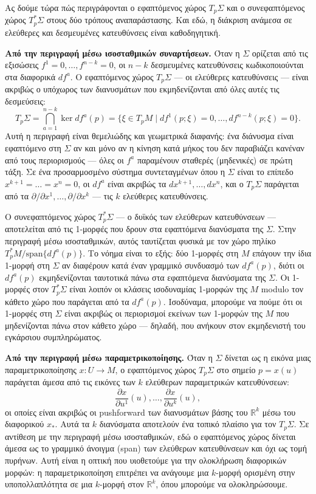 \documentclass[11pt,a4paper,twoside,openright]{book}
\begin{document}
Ας δούμε τώρα πώς περιγράφονται ο εφαπτόμενος χώρος $T_p\Sigma$ και ο συνεφαπτόμενος χώρος $T_p^*\Sigma$ στους δύο τρόπους αναπαράστασης. Και εδώ, η διάκριση ανάμεσα σε ελεύθερες και δεσμευμένες κατευθύνσεις είναι καθοδηγητική.

\textbf{Από την περιγραφή μέσω ισοσταθμικών συναρτήσεων.} Όταν η $\Sigma$ ορίζεται από τις εξισώσεις $f^1 = 0, \dots, f^{n-k} = 0$, οι $n-k$ δεσμευμένες κατευθύνσεις κωδικοποιούνται στα διαφορικά $df^a$. Ο εφαπτόμενος χώρος $T_p\Sigma$ --- οι ελεύθερες κατευθύνσεις --- είναι ακριβώς ο υπόχωρος των διανυσμάτων που εκμηδενίζονται από όλες αυτές τις δεσμεύσεις:
\[
T_p\Sigma = \bigcap_{a=1}^{n-k} \ker df^a(p) = \{ \xi \in T_pM \mid df^1(p; \xi) = 0, \dots, df^{n-k}(p; \xi) = 0 \}. \tag{0.12}
\]
Αυτή η περιγραφή είναι θεμελιώδης και γεωμετρικά διαφανής: ένα διάνυσμα είναι εφαπτόμενο στη $\Sigma$ αν και μόνο αν η κίνηση κατά μήκος του δεν παραβιάζει κανέναν από τους περιορισμούς --- όλες οι $f^a$ παραμένουν σταθερές (μηδενικές) σε πρώτη τάξη. Σε ένα προσαρμοσμένο σύστημα συντεταγμένων όπου η $\Sigma$ είναι το επίπεδο $x^{k+1} = \dots = x^n = 0$, οι $df^a$ είναι ακριβώς τα $dx^{k+1}, \dots, dx^n$, και ο $T_p\Sigma$ παράγεται από τα $\partial / \partial x^1, \dots, \partial / \partial x^k$ --- τις $k$ ελεύθερες κατευθύνσεις.

Ο συνεφαπτόμενος χώρος $T_p^*\Sigma$ --- ο δυϊκός των ελεύθερων κατευθύνσεων --- αποτελείται από τις 1-μορφές που δρουν στα εφαπτόμενα διανύσματα της $\Sigma$. Στην περιγραφή μέσω ισοσταθμικών, αυτός ταυτίζεται φυσικά με τον χώρο πηλίκο $T_p^*M / \text{span}\{df^a(p)\}$. Το νόημα είναι το εξής: δύο 1-μορφές στη $M$ επάγουν την ίδια 1-μορφή στη $\Sigma$ αν διαφέρουν κατά έναν γραμμικό συνδυασμό των $df^a(p)$, διότι οι $df^a(p)$ εκμηδενίζονται ταυτοτικά πάνω στα εφαπτόμενα διανύσματα της $\Sigma$. Οι 1-μορφές στον $T_p^*\Sigma$ είναι λοιπόν οι κλάσεις ισοδυναμίας 1-μορφών της $M$ modulo τον κάθετο χώρο που παράγεται από τα $df^a(p)$. Ισοδύναμα, μπορούμε να πούμε ότι οι 1-μορφές στη $\Sigma$ είναι ακριβώς οι περιορισμοί εκείνων των 1-μορφών της $M$ που μηδενίζονται πάνω στον κάθετο χώρο --- δηλαδή, που ανήκουν στον εκμηδενιστή του εγκάρσιου συμπληρώματος.

\textbf{Από την περιγραφή μέσω παραμετρικοποίησης.} Όταν η $\Sigma$ δίνεται ως η εικόνα μιας παραμετρικοποίησης $x: U \to M$, ο εφαπτόμενος χώρος $T_p\Sigma$ στο σημείο $p = x(u)$ παράγεται άμεσα από τις εικόνες των $k$ ελεύθερων παραμετρικών κατευθύνσεων:
\[
\frac{\partial x}{\partial u^1}(u), \dots, \frac{\partial x}{\partial u^k}(u),
\]
οι οποίες είναι ακριβώς οι pushforward των διανυσμάτων βάσης του $\mathbb{R}^k$ μέσω του διαφορικού $x_*$. Αυτά τα $k$ διανύσματα αποτελούν ένα τοπικό πλαίσιο για τον $T_p\Sigma$. Σε αντίθεση με την περιγραφή μέσω ισοσταθμικών, εδώ ο εφαπτόμενος χώρος δίνεται άμεσα ως το γραμμικό άνοιγμα (span) των ελεύθερων κατευθύνσεων και όχι ως τομή πυρήνων. Αυτή είναι η οπτική που υιοθετούμε για την ολοκλήρωση διαφορικών μορφών: η παραμετρικοποίηση επιτρέπει να ανάγουμε μια $k$-μορφή ορισμένη στην υποπολλαπλότητα σε μια $k$-μορφή στον $\mathbb{R}^k$, όπου μπορούμε να ολοκληρώσουμε.
\end{document}
